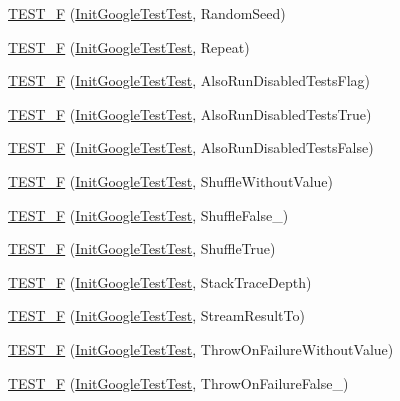 \begin{DoxyCompactItemize}
\hyperlink{namespacetesting_a2a1e31fea507bdd6e011450e2f316bcf}{\-T\-E\-S\-T\-\_\-\-F} (\hyperlink{classtesting_1_1InitGoogleTestTest}{\-Init\-Google\-Test\-Test}, \-Random\-Seed)
\item 
\hyperlink{namespacetesting_a254368f412c980556143a9182f451981}{\-T\-E\-S\-T\-\_\-\-F} (\hyperlink{classtesting_1_1InitGoogleTestTest}{\-Init\-Google\-Test\-Test}, \-Repeat)
\item 
\hyperlink{namespacetesting_ab6624d856abda0913f536a4e719dd769}{\-T\-E\-S\-T\-\_\-\-F} (\hyperlink{classtesting_1_1InitGoogleTestTest}{\-Init\-Google\-Test\-Test}, \-Also\-Run\-Disabled\-Tests\-Flag)
\item 
\hyperlink{namespacetesting_a3e73dbd19fb50e5ad516de9592963033}{\-T\-E\-S\-T\-\_\-\-F} (\hyperlink{classtesting_1_1InitGoogleTestTest}{\-Init\-Google\-Test\-Test}, \-Also\-Run\-Disabled\-Tests\-True)
\item 
\hyperlink{namespacetesting_a1c50ef2a972315130f1613c69204e259}{\-T\-E\-S\-T\-\_\-\-F} (\hyperlink{classtesting_1_1InitGoogleTestTest}{\-Init\-Google\-Test\-Test}, \-Also\-Run\-Disabled\-Tests\-False)
\item 
\hyperlink{namespacetesting_a2f1fd86207e6c7085455dc2d582d1d12}{\-T\-E\-S\-T\-\_\-\-F} (\hyperlink{classtesting_1_1InitGoogleTestTest}{\-Init\-Google\-Test\-Test}, \-Shuffle\-Without\-Value)
\item 
\hyperlink{namespacetesting_a1acc3dcde65e75293451073528cb1c5a}{\-T\-E\-S\-T\-\_\-\-F} (\hyperlink{classtesting_1_1InitGoogleTestTest}{\-Init\-Google\-Test\-Test}, \-Shuffle\-False\-\_)
\item 
\hyperlink{namespacetesting_a24bb2b3783b9e0c419db7f974b641cd4}{\-T\-E\-S\-T\-\_\-\-F} (\hyperlink{classtesting_1_1InitGoogleTestTest}{\-Init\-Google\-Test\-Test}, \-Shuffle\-True)
\item 
\hyperlink{namespacetesting_af8579f8ad3383827814d1fbea4fdeee9}{\-T\-E\-S\-T\-\_\-\-F} (\hyperlink{classtesting_1_1InitGoogleTestTest}{\-Init\-Google\-Test\-Test}, \-Stack\-Trace\-Depth)
\item 
\hyperlink{namespacetesting_ad9cf0c452b4d2645b037725957021c6c}{\-T\-E\-S\-T\-\_\-\-F} (\hyperlink{classtesting_1_1InitGoogleTestTest}{\-Init\-Google\-Test\-Test}, \-Stream\-Result\-To)
\item 
\hyperlink{namespacetesting_a2824800277b4a1e8732abd5d7c2349d1}{\-T\-E\-S\-T\-\_\-\-F} (\hyperlink{classtesting_1_1InitGoogleTestTest}{\-Init\-Google\-Test\-Test}, \-Throw\-On\-Failure\-Without\-Value)
\item 
\hyperlink{namespacetesting_adfcdbd6b2715fddd03a47a822517ddea}{\-T\-E\-S\-T\-\_\-\-F} (\hyperlink{classtesting_1_1InitGoogleTestTest}{\-Init\-Google\-Test\-Test}, \-Throw\-On\-Failure\-False\-\_)

\end{DoxyCompactItemize}
